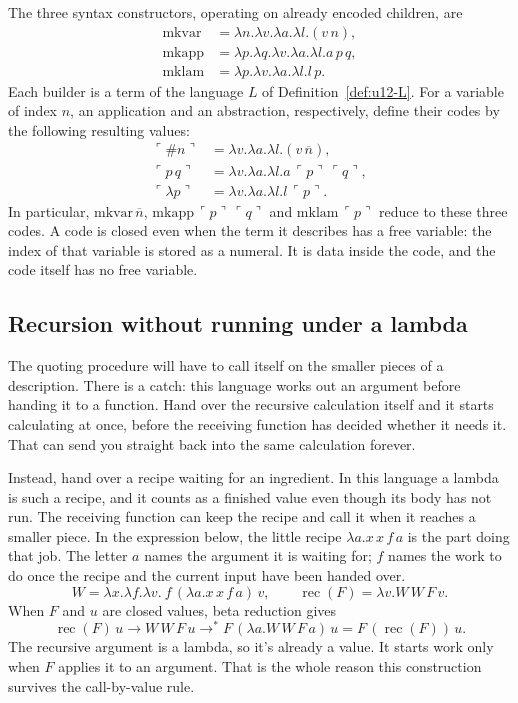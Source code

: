 \documentclass[11pt,twoside]{article}
\theoremstyle{thielethm}
\theoremstyle{thieledef}
\theoremstyle{thieledef}
\theoremstyle{thieledef}
\theoremstyle{thielethm}
\theoremstyle{thieleobs}
\theoremstyle{thielethm}
\begin{document}
The three syntax constructors, operating on already encoded children, are
\[
\begin{aligned}
\mathrm{mkvar}&=\lambda n.\lambda v.\lambda a.\lambda l.(v\,n),\\
\mathrm{mkapp}&=\lambda p.\lambda q.\lambda v.\lambda a.\lambda l.a\,p\,q,\\
\mathrm{mklam}&=\lambda p.\lambda v.\lambda a.\lambda l.l\,p.
\end{aligned}
\]
Each builder is a term of the language $L$ of Definition~\ref{def:u12-L}.
For a variable of index $n$, an application and an abstraction, respectively, define
their codes by the following resulting values:
\[
\begin{aligned}
\ulcorner\#n\urcorner&=\lambda v.\lambda a.\lambda l.(v\,\overline n),\\
\ulcorner p\,q\urcorner&=\lambda v.\lambda a.\lambda l.a\,\ulcorner p\urcorner\,\ulcorner q\urcorner,\\
\ulcorner\lambda p\urcorner&=\lambda v.\lambda a.\lambda l.l\,\ulcorner p\urcorner.
\end{aligned}
\]
In particular, $\mathrm{mkvar}\,\overline n$, $\mathrm{mkapp}\,\ulcorner p\urcorner\,\ulcorner q\urcorner$ and
$\mathrm{mklam}\,\ulcorner p\urcorner$ reduce to these three codes. A code is closed even when
the term it describes has a free variable: the index of that variable is stored
as a numeral. It is data inside the code, and the code itself has no free variable.

\subsection{Recursion without running under a lambda}

The quoting procedure will have to call itself on the smaller pieces of a
description. There is a catch: this language works out an argument before
handing it to a function. Hand over the recursive calculation itself and it
starts calculating at once, before the receiving function has decided whether
it needs it. That can send you straight back into the same calculation forever.

Instead, hand over a recipe waiting for an ingredient. In this language a
lambda is such a recipe, and it counts as a finished value even though its
body has not run. The receiving function can keep the recipe and call it when
it reaches a smaller piece. In the expression below, the little recipe
$\lambda a.x\,x\,f\,a$ is the part doing that job. The letter $a$ names the
argument it is waiting for; $f$ names the work to do once the recipe and the
current input have been handed over.
\[
W=\lambda x.\lambda f.\lambda v.\ f\,(\lambda a.x\,x\,f\,a)\,v,
\qquad
\operatorname{rec}(F)=\lambda v.W\,W\,F\,v.
\]
When $F$ and $u$ are closed values, beta reduction gives
\[
\operatorname{rec}(F)\,u
\longrightarrow W\,W\,F\,u
\longrightarrow^{*} F\,(\lambda a.W\,W\,F\,a)\,u
=F\,(\operatorname{rec}(F))\,u.
\]
The recursive argument is a lambda, so it's already a value. It starts work only when
$F$ applies it to an argument. That is the whole reason this construction survives
the call-by-value rule.
\end{document}
